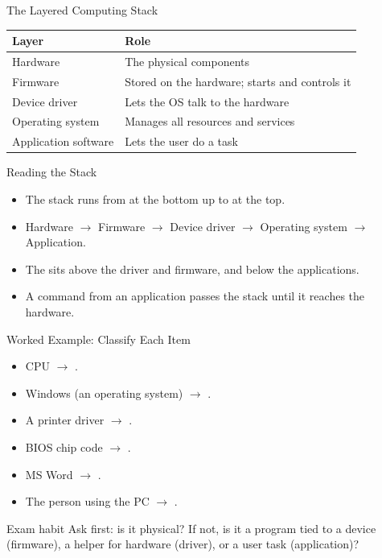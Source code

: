 \documentclass[aspectratio=169]{beamer}
\begin{document}
\begin{frame}{The Layered Computing Stack}
  \begin{center}
    \begin{tabular}{p{}p{}}
      \toprule
      \textbf{Layer} & \textbf{Role} \\
      \midrule
      Hardware & The physical components \\
      Firmware & Stored on the hardware; starts and controls it \\
      Device driver & Lets the OS talk to the hardware \\
      Operating system & Manages all resources and services \\
      Application software & Lets the user do a task \\
      \bottomrule
    \end{tabular}
  \end{center}
  \vspace{0.15cm}
\end{frame}

\begin{frame}{Reading the Stack}
  \begin{itemize}
    \item The stack runs from  at the bottom up to
       at the top.
    \item {} Hardware $\rightarrow$ Firmware $\rightarrow$
      Device driver $\rightarrow$ Operating system $\rightarrow$
      Application.
    \item The  sits above the driver and firmware, and
      below the applications.
    \item A command from an application passes  the stack until it
      reaches the hardware.
  \end{itemize}
\end{frame}

\begin{frame}{Worked Example: Classify Each Item}
  \begin{itemize}
    \item CPU $\rightarrow$ .
    \item Windows (an operating system) $\rightarrow$ .
    \item A printer driver $\rightarrow$ .
    \item BIOS chip code $\rightarrow$ .
    \item MS Word $\rightarrow$ .
    \item The person using the PC $\rightarrow$ .
  \end{itemize}
  \begin{exampleblock}{Exam habit}
    Ask first: is it physical? If not, is it a program tied to a device
    (firmware), a helper for hardware (driver), or a user task (application)?
  \end{exampleblock}
\end{frame}
\end{document}
